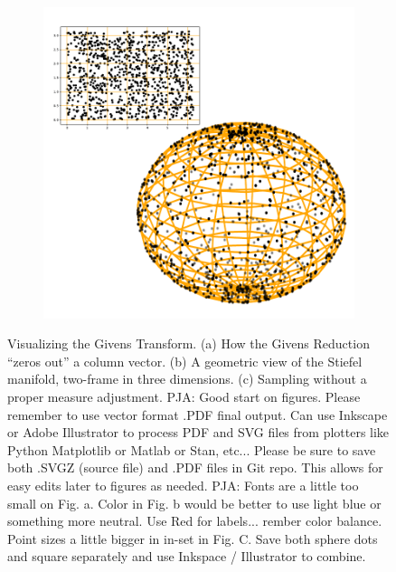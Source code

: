 \documentclass{article}
\newcommand{\commentPJA}[1]{{\textcolor{commentPJA_color}{PJA: #1}}}
\begin{document}
\begin{figure}
\begin{subfigure}[b]{0.3\textwidth}
        \caption{}
        \label{fig:StiefelGeom}
    \end{subfigure}
    ~ %
    \begin{subfigure}[b]{0.3\textwidth}
        \includegraphics[width=\textwidth]{AreaForm.pdf}
        \caption{}
        \label{fig:AreaForm}
    \end{subfigure}
    \caption{Visualizing the Givens Transform. (a) How the Givens Reduction ``zeros out'' a column vector. (b) A geometric view of the Stiefel manifold, two-frame in three dimensions. (c) Sampling without a proper measure adjustment. \commentPJA{Good start on figures.  Please remember to use vector format .PDF final output.  Can use Inkscape or Adobe Illustrator to process PDF and SVG files from plotters like Python Matplotlib or Matlab or Stan, etc... Please be sure to save both .SVGZ (source file) and .PDF files in Git repo. This allows for easy edits later to figures as needed.}  \commentPJA{Fonts are a little too small on Fig. a.  Color in Fig. b would be better to use light blue or something more neutral.   Use Red for labels... rember color balance.  Point sizes a little bigger in in-set in Fig. C.  Save both sphere dots and square separately and use Inkspace / Illustrator to combine.}  }\label{fig:Givens}
\end{figure}
\end{document}

